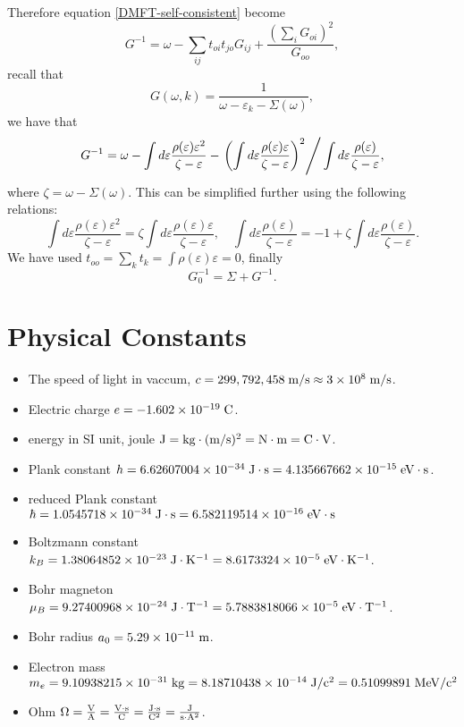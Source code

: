 \documentclass{book}
\numberwithin{equation}{section}
\begin{document}
Therefore equation \eqref{DMFT-self-consistent} become
\begin{equation}
  G^{-1}=\omega-\sum_{ij}t_{oi}t_{jo}G_{ij}+
  \frac{\left(\sum_iG_{oi}\right)^2}{G_{oo}},
\end{equation}
recall that 
\begin{equation}
  G(\omega,k)=\frac{1}{\omega-\varepsilon_k-\Sigma(\omega)},
\end{equation}
we have that
\begin{equation}
  G^{-1}=\omega-\int d\varepsilon
  \frac{\rho(\varepsilon)\varepsilon^2}{\zeta-\varepsilon}
  -\left.\left(\int d\varepsilon
  \frac{\rho(\varepsilon)\varepsilon}{\zeta-\varepsilon}\right)^2\right/
  \int d\varepsilon\frac{\rho(\varepsilon)}{\zeta-\varepsilon},
\end{equation}
where $\zeta=\omega-\Sigma(\omega)$. This can be simplified further
using the following relations:
\begin{equation}
  \int d\varepsilon\frac{\rho(\varepsilon)\varepsilon^2}{\zeta-\varepsilon}
  =\zeta\int d\varepsilon
  \frac{\rho(\varepsilon)\varepsilon}{\zeta-\varepsilon},\quad
  \int d\varepsilon\frac{\rho(\varepsilon)}{\zeta-\varepsilon}=
  -1+\zeta\int d\varepsilon\frac{\rho(\varepsilon)}{\zeta-\varepsilon}.
\end{equation}
We have used $t_{oo}=\sum_kt_k=\int\rho(\varepsilon)\varepsilon=0$, finally
\begin{equation}
  G_0^{-1}=\Sigma+G^{-1}.
\end{equation}
\chapter{Physical Constants}
\begin{itemize}
\item The speed of light in vaccum, $c=299,792,458\;{\rm
  m/s}\approx3\times10^8\;{\rm m/s}$.
\item Electric charge $e=-1.602\times10^{-19}\;{\rm C}$.
\item energy in SI unit, joule $\rm J=kg\cdot(m/s)^2=N\cdot m=C\cdot V$.
\item Plank constant $h=6.62607004\times10^{-34}\;\rm{J\cdot s}=
  4.135667662\times10^{-15}\;{\rm eV\cdot s}$.
\item reduced Plank constant $\hbar=1.0545718\times10^{-34}\;{\rm J\cdot s}
  =6.582119514\times10^{-16}\;{\rm eV\cdot s}$
\item Boltzmann constant $k_B=1.38064852\times10^{-23}\;{\rm J\cdot K^{-1}}
  =8.6173324\times10^{-5}\;{\rm eV\cdot K^{-1}}$.
\item Bohr magneton $\mu_B=9.27400968\times10^{-24}\;{\rm J\cdot T^{-1}}
  =5.7883818066\times10^{-5}\;{\rm eV\cdot T^{-1}}$.
\item Bohr radius $a_0=5.29\times10^{-11}\;\rm m$.
\item Electron mass $m_e=9.10938215\times10^{-31}\;{\rm kg}
  =8.18710438\times10^{-14}\;{\rm J/c^2}=0.51099891\;{\rm MeV/c^2}$
\item Ohm $\Omega\rm=\frac{V}{A}=\frac{V\cdot s}{C}=\frac{J\cdot s}{C^2}
  =\frac{J}{s\cdot A^2}$.
\end{itemize}
\end{document}
